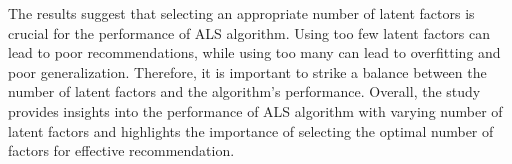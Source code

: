 The results suggest that selecting an appropriate number of latent factors is crucial for the performance of ALS algorithm. Using too few latent factors can lead to poor recommendations, while using too many can lead to overfitting and poor generalization. Therefore, it is important to strike a balance between the number of latent factors and the algorithm's performance. Overall, the study provides insights into the performance of ALS algorithm with varying number of latent factors and highlights the importance of selecting the optimal number of factors for effective recommendation.


